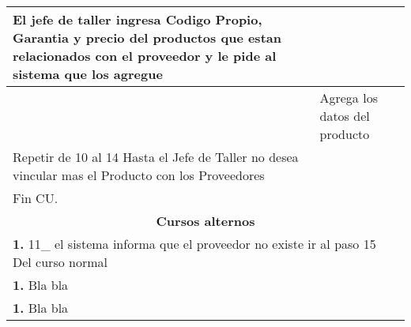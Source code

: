 \begin{longtable}{ |p{8cm}|p{8cm}| }
			\hline
			\inc El jefe de taller ingresa Codigo Propio, Garantia y precio del productos que estan relacionados con el proveedor y le pide al sistema que los agregue  &   \\
			\hline
			& \inc  Agrega los datos del producto   \\
			\hline
			\inc Repetir de 10 al 14 Hasta el Jefe de Taller no desea vincular mas el Producto con los Proveedores &  \\
			\hline
			\inc Fin CU. & \\
		\hline
		\multicolumn{2}{|c|}{\textbf{Cursos alternos}}\\
		\hline
		\multicolumn{2}{|p{16cm}|}{\textbf{1. }11_ el sistema informa que el proveedor no existe ir al paso 15 Del curso normal }\\
		\hline
		\multicolumn{2}{|p{16cm}|}{\textbf{1. }Bla bla }\\
		\hline
		\multicolumn{2}{|p{16cm}|}{\textbf{1. }Bla bla }\\
		\hline	
	\end{longtable}